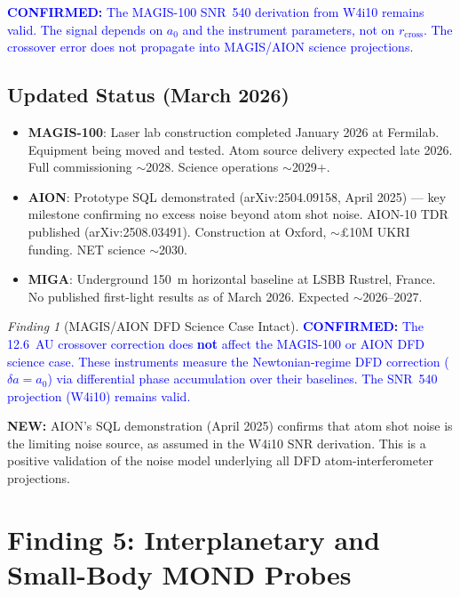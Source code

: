 \documentclass[11pt]{article}
\theoremstyle{definition}
\theoremstyle{remark}
\newtheorem{finding}[theorem]{Finding}
\newcommand{\azero}{a_0}
\newcommand{\confirmed}[1]{\textcolor{blue}{\textbf{CONFIRMED:} #1}}
\newcommand{\newresult}[1]{\textcolor{green!50!black}{\textbf{NEW:} #1}}
\begin{document}
\confirmed{The MAGIS-100 SNR~540 derivation from W4i10 remains
valid. The signal depends on $\azero$ and the instrument parameters,
not on $r_{\mathrm{cross}}$. The crossover error does not propagate
into MAGIS/AION science projections.}

\subsection{Updated Status (March 2026)}

\begin{itemize}[nosep]
\item \textbf{MAGIS-100}: Laser lab construction completed January
  2026 at Fermilab. Equipment being moved and tested. Atom source
  delivery expected late 2026. Full commissioning $\sim$2028.
  Science operations $\sim$2029+.
\item \textbf{AION}: Prototype SQL demonstrated (arXiv:2504.09158,
  April 2025) --- key milestone confirming no excess noise beyond
  atom shot noise. AION-10 TDR published (arXiv:2508.03491).
  Construction at Oxford, $\sim$\pounds10M UKRI funding.
  NET science $\sim$2030.
\item \textbf{MIGA}: Underground 150~m horizontal baseline at
  LSBB Rustrel, France. No published first-light results as of
  March 2026. Expected $\sim$2026--2027.
\end{itemize}

\begin{finding}[MAGIS/AION DFD Science Case Intact]
\label{find:magis-confirmed}
\confirmed{The 12.6~AU crossover correction does \textbf{not} affect
the MAGIS-100 or AION DFD science case. These instruments measure the
Newtonian-regime DFD correction ($\delta a = \azero$) via differential
phase accumulation over their baselines. The SNR~540 projection
(W4i10) remains valid.}

\newresult{AION's SQL demonstration (April 2025) confirms that
atom shot noise is the limiting noise source, as assumed in the
W4i10 SNR derivation. This is a positive validation of the
noise model underlying all DFD atom-interferometer projections.}
\end{finding}

\section{Finding 5: Interplanetary and Small-Body MOND Probes}
\label{sec:interplanetary}
\end{document}

